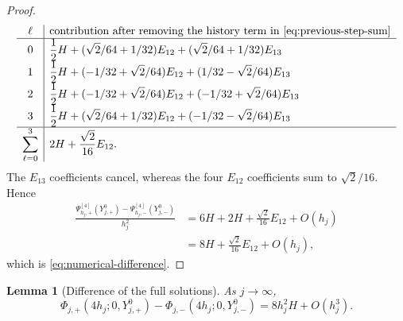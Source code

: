 \documentclass[10pt,a4paper]{amsart}
\numberwithin{equation}{section}
\newtheorem{lemma}[theorem]{Lemma}
\begin{document}
\begin{proof}
\begin{equation}
\begin{array}{c|l}
\ell&\text{contribution after removing the history term in
\eqref{eq:previous-step-sum}}\\
\hline
0&\displaystyle \frac12H+(\sqrt2/64+1/32)E_{12}
 +(\sqrt2/64+1/32)E_{13}\\[1mm]
1&\displaystyle \frac12H+(-1/32+\sqrt2/64)E_{12}
 +(1/32-\sqrt2/64)E_{13}\\[1mm]
2&\displaystyle \frac12H+(-1/32+\sqrt2/64)E_{12}
 +(-1/32+\sqrt2/64)E_{13}\\[1mm]
3&\displaystyle \frac12H+(\sqrt2/64+1/32)E_{12}
 +(-1/32-\sqrt2/64)E_{13}\\[1mm]
\hline
\displaystyle\sum_{\ell=0}^3
 &\displaystyle 2H+\frac{\sqrt2}{16}E_{12}.
\end{array}
\end{equation}
The $E_{13}$ coefficients cancel, whereas the four $E_{12}$
coefficients sum to $\sqrt2/16$.  Hence
\begin{align*}
 \frac{\Psi^{[4]}_{h_j,+}(Y_{j,+}^0)-\Psi^{[4]}_{h_j,-}(Y_{j,-}^0)}{h_j^2}
 &=6H+2H+\frac{\sqrt2}{16}E_{12}+O(h_j)\\
 &=8H+\frac{\sqrt2}{16}E_{12}+O(h_j),
\end{align*}
which is \eqref{eq:numerical-difference}.
\end{proof}

\begin{lemma}[Difference of the full solutions]
\label{lem:full-flow-difference}
As $j\to\infty$,
\begin{equation}\label{eq:full-flow-difference}
 \Phi_{j,+}(4h_j;0,Y_{j,+}^0)-\Phi_{j,-}(4h_j;0,Y_{j,-}^0)
 =8h_j^2H+O(h_j^3).
\end{equation}
\end{lemma}
\end{document}
